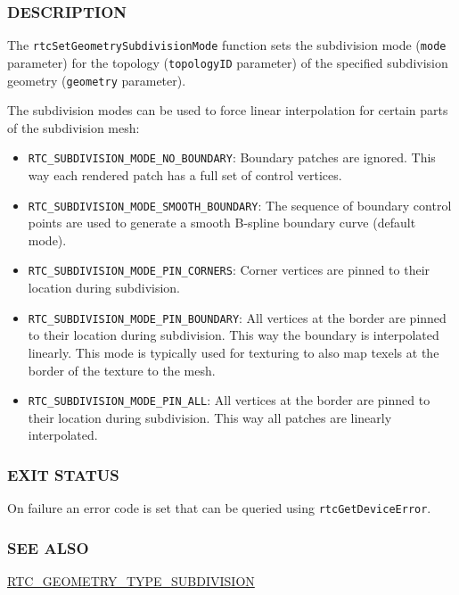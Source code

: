 \subsubsection{DESCRIPTION}\label{description}

The \texttt{rtcSetGeometrySubdivisionMode} function sets the subdivision
mode (\texttt{mode} parameter) for the topology (\texttt{topologyID}
parameter) of the specified subdivision geometry (\texttt{geometry}
parameter).

The subdivision modes can be used to force linear interpolation for
certain parts of the subdivision mesh:

\begin{itemize}
\item
  \texttt{RTC\_SUBDIVISION\_MODE\_NO\_BOUNDARY}: Boundary patches are
  ignored. This way each rendered patch has a full set of control
  vertices.
\item
  \texttt{RTC\_SUBDIVISION\_MODE\_SMOOTH\_BOUNDARY}: The sequence of
  boundary control points are used to generate a smooth B-spline
  boundary curve (default mode).
\item
  \texttt{RTC\_SUBDIVISION\_MODE\_PIN\_CORNERS}: Corner vertices are
  pinned to their location during subdivision.
\item
  \texttt{RTC\_SUBDIVISION\_MODE\_PIN\_BOUNDARY}: All vertices at the
  border are pinned to their location during subdivision. This way the
  boundary is interpolated linearly. This mode is typically used for
  texturing to also map texels at the border of the texture to the mesh.
\item
  \texttt{RTC\_SUBDIVISION\_MODE\_PIN\_ALL}: All vertices at the border
  are pinned to their location during subdivision. This way all patches
  are linearly interpolated.
\end{itemize}

\subsubsection{EXIT STATUS}\label{exit-status}

On failure an error code is set that can be queried using
\texttt{rtcGetDeviceError}.

\subsubsection{SEE ALSO}\label{see-also}

\hyperref[rtc_geometry_type_subdivision]{RTC\_GEOMETRY\_TYPE\_SUBDIVISION}

